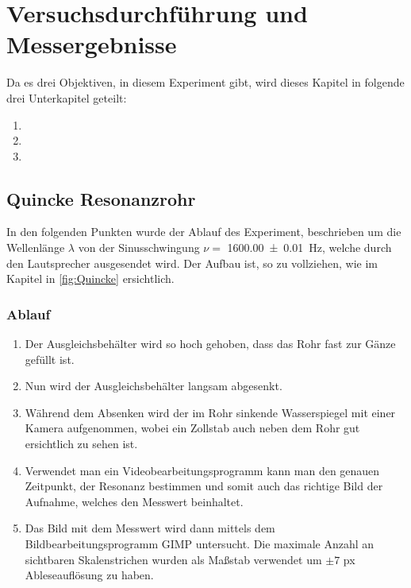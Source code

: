 \documentclass[11pt]{scrartcl}
\begin{document}
\section{Versuchsdurchführung und Messergebnisse}
\label{sec:versuchsdurchfuehrung_messergebnisse}

Da es drei Objektiven, in diesem Experiment gibt, wird dieses Kapitel
in folgende drei Unterkapitel geteilt:

\begin{enumerate}
    \item {}
    \item {}
    \item {}
\end{enumerate}

\subsection{Quincke Resonanzrohr}
\label{ssec:Quincke_versuch}

In den folgenden Punkten wurde der Ablauf des Experiment, beschrieben um
die Wellenlänge $\lambda$ von der Sinusschwingung $\nu=$ \SI{1600.00(1)}{\hertz},
welche durch den Lautsprecher ausgesendet wird. Der Aufbau ist, so
zu vollziehen, wie im Kapitel  in
\autoref{fig:Quincke} ersichtlich.

\subsubsection{Ablauf}
\begin{enumerate}
    \item Der Ausgleichsbehälter wird so hoch gehoben, dass das Rohr
        fast zur Gänze gefüllt ist.
    \item Nun wird der Ausgleichsbehälter langsam abgesenkt.
    \item Während dem Absenken wird der im Rohr sinkende Wasserspiegel
        mit einer Kamera aufgenommen, wobei ein Zollstab auch neben
        dem Rohr gut ersichtlich zu sehen ist.
    \item Verwendet man ein Videobearbeitungsprogramm kann man
        den genauen Zeitpunkt, der Resonanz bestimmen und somit
        auch das richtige Bild der Aufnahme, welches den Messwert
        beinhaltet.
    \item Das Bild mit dem Messwert wird dann mittels dem Bildbearbeitungsprogramm
        GIMP untersucht. Die maximale Anzahl an sichtbaren Skalenstrichen 
        wurden als Maßstab verwendet um $\pm 7$ px Ableseauflösung zu
        haben.
\end{enumerate}
\end{document}
